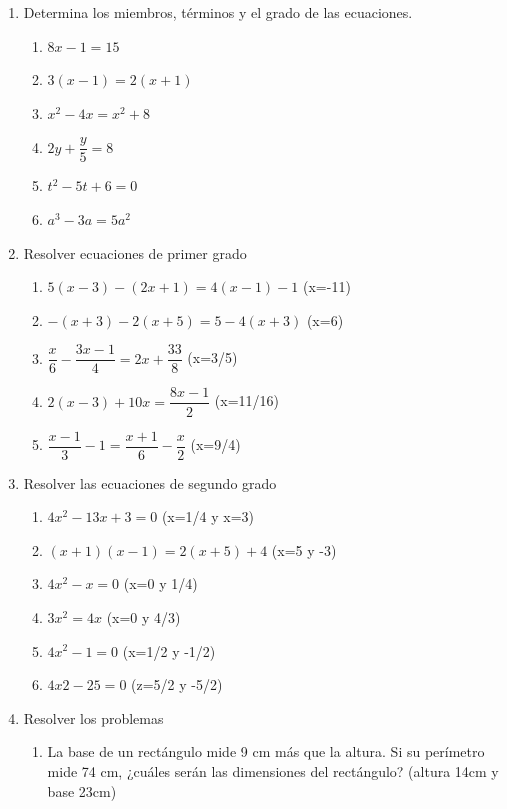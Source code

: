 \documentclass[a4paper,12pt]{article}
\begin{document}
    \begin{enumerate}
            \item Determina los miembros, términos y el grado de las ecuaciones.
            \begin{enumerate}
                \item $8x-1=15$
                \item $3(x-1)=2(x+1)$
                \item $x^2-4x=x^2+8$
                \item $2y+\dfrac{y}{5}=8$
                \item $t^2-5t+6=0$
                \item $a^3-3a=5a^2$
            \end{enumerate}
            \item Resolver ecuaciones de primer grado
                \begin{enumerate}
                    \item $5(x-3)-(2x+1)=4(x-1)-1$ (x=-11)
                    \item $-(x+3)-2(x+5)=5-4(x+3)$ (x=6)
                    \item $\dfrac{x}{6}-\dfrac{3x-1}{4}=2x+\dfrac{33}{8}$ (x=3/5)
                    \item $2(x-3)+10x=\dfrac{8x-1}{2}$ (x=11/16)
                    \item $\dfrac{x-1}{3}-1 =\dfrac{x+1}{6}-\dfrac{x}{2}$ (x=9/4)
                \end{enumerate}
            \item Resolver las ecuaciones de segundo grado
                \begin{enumerate}
                    \item $4x^2-13x+3=0 $ (x=1/4 y x=3)
                    \item $(x + 1) (x - 1) = 2(x + 5) + 4$ (x=5 y -3)
                    \item $4x^2 - x = 0$ (x=0 y 1/4)
                    \item $3x^2 = 4x$ (x=0 y 4/3)
                    \item $4x^2 - 1 = 0$ (x=1/2 y -1/2)
                    \item $4x2 - 25 = 0$ (z=5/2 y -5/2)
                \end{enumerate}
            \item Resolver los problemas
                 \begin{enumerate}
                    \item  La base de un rectángulo mide 9 cm más que la altura. Si su perímetro mide 74 cm, ¿cuáles serán las dimensiones del rectángulo? (altura 14cm y base 23cm)

\end{enumerate}
\end{enumerate}
\end{document}
